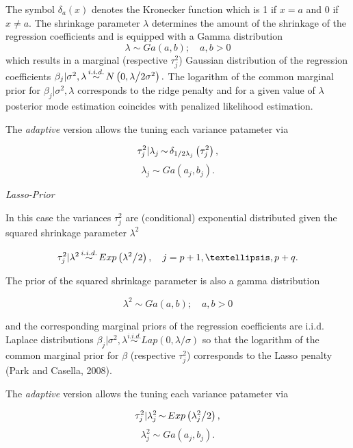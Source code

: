 \documentclass[11pt,a4paper,twoside]{bayesxarticle}
\begin{document}
The symbol $\delta _{a} (x)$ denotes the Kronecker function which is 1 if $x=a$ and
0 if $x\ne a$. The shrinkage parameter $\lambda $ determines the amount of the shrinkage
of the regression coefficients and is equipped with a Gamma distribution
\[\lambda \sim Ga\left(a,b\right);\quad a,b>0\]
which results in a marginal (respective $\tau_{j}^2$) Gaussian distribution of the regression coefficients $\beta_j |\sigma^2,\lambda \mathop{\sim
}\limits^{i.i.d.} N\left(0,{\lambda \mathord{\left/ { \vphantom {\sigma^2  2\lambda}} \right. \kern-\nulldelimiterspace} 2\sigma^2} \right).$
The logarithm of the common marginal prior for $\beta_j |\sigma^2,\lambda $ corresponds to the ridge penalty
and for a given value of $\lambda $ posterior mode estimation coincides with penalized likelihood estimation.

The {\em adaptive} version allows the tuning each variance patameter via

\[\tau _{j}^{2} |\lambda_j \mathop{\sim }\limits \delta _{{1\mathord{\left/
{\vphantom {1 2\lambda_j }} \right. \kern-\nulldelimiterspace} 2\lambda_j } } \left(
\tau _{j}^{2} \right),\]
\[{\lambda _j}\sim Ga\left( {{a_j},{b_j}} \right).\]


{\em Lasso-Prior}

In this case the variances $\tau _{j}^{2} $ are (conditional) exponential distributed
given the squared shrinkage parameter $\lambda ^{2} $

\begin{equation}
\label{ZEqnNum508369}
\tau _{j}^{2} |\lambda ^{2} \mathop{\sim }\limits^{i.i.d.} Exp\left({\lambda ^{2}
\mathord{\left/ {\vphantom {\lambda ^{2}  2}} \right. \kern-\nulldelimiterspace}
2} \right),\quad j=p+1,\ldots,p+q.
\end{equation}

The prior of the squared shrinkage parameter is also a gamma distribution

\[\lambda ^{2} \sim Ga\left(a,b\right);\quad a,b>0\]

and the corresponding marginal priors of the regression coefficients are i.i.d. Laplace
distributions $\beta _{j} |\sigma^2,\lambda \mathop{\sim }\limits^{i.i.d.} Lap\left(0,
\lambda / \sigma \right)$ so that the logarithm of the common marginal prior for $\beta $ (respective $\tau_{j}^2$) corresponds
to the Lasso penalty (Park and Casella, 2008).

The {\em adaptive} version allows the tuning each variance patameter via

\[\tau _{j}^{2} |\lambda_{j}^{2} \mathop{\sim }\limits Exp\left({\lambda_{j}^{2}
\mathord{\left/ {\vphantom {\lambda_{j}^{2}  2}} \right. \kern-\nulldelimiterspace}
2} \right),\]
\[\lambda _j^2\sim Ga\left( {{a_j},{b_j}} \right).\]
\end{document}
